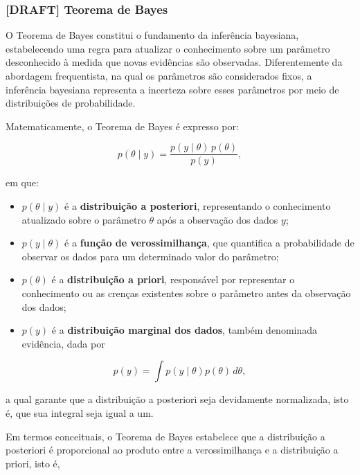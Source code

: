\documentclass[
  brazilian,
  12pt,
  letterpaper,
  DIV=11,
  numbers=noendperiod]{scrartcl}
\begin{document}
\subsubsection{{[}DRAFT{]} Teorema de Bayes}\label{sec-teorema-bayes}

O Teorema de Bayes constitui o fundamento da inferência bayesiana,
estabelecendo uma regra para atualizar o conhecimento sobre um parâmetro
desconhecido à medida que novas evidências são observadas.
Diferentemente da abordagem frequentista, na qual os parâmetros são
considerados fixos, a inferência bayesiana representa a incerteza sobre
esses parâmetros por meio de distribuições de probabilidade.

Matematicamente, o Teorema de Bayes é expresso por:

\begin{equation}
p(\theta \mid y) =
\frac{p(y \mid \theta)\,p(\theta)}
{p(y)},
\label{eq:bayes}
\end{equation}

em que:

\begin{itemize}
\item
  \(p(\theta \mid y)\) é a \textbf{distribuição a posteriori},
  representando o conhecimento atualizado sobre o parâmetro \(\theta\)
  após a observação dos dados \(y\);
\item
  \(p(y \mid \theta)\) é a \textbf{função de verossimilhança}, que
  quantifica a probabilidade de observar os dados para um determinado
  valor do parâmetro;
\item
  \(p(\theta)\) é a \textbf{distribuição a priori}, responsável por
  representar o conhecimento ou as crenças existentes sobre o parâmetro
  antes da observação dos dados;
\item
  \(p(y)\) é a \textbf{distribuição marginal dos dados}, também
  denominada evidência, dada por
\end{itemize}

\begin{equation}
p(y)=\int p(y\mid\theta)p(\theta)\,d\theta,
\label{eq:evidence}
\end{equation}

a qual garante que a distribuição a posteriori seja devidamente
normalizada, isto é, que sua integral seja igual a um.

Em termos conceituais, o Teorema de Bayes estabelece que a distribuição
a posteriori é proporcional ao produto entre a verossimilhança e a
distribuição a priori, isto é,
\end{document}
